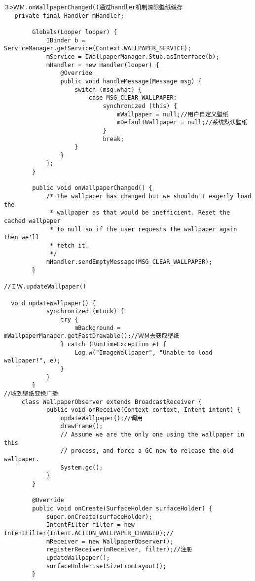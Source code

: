 \documentclass[a4paper,11pt,twoside,openany]{article}%
\begin{document}
\begin{CJK}{UTF8}{song}
\begin{verbatim}
３>ＷＭ.onWallpaperChanged()通过handler机制清除壁纸缓存 
   private final Handler mHandler; 
        
        Globals(Looper looper) { 
            IBinder b = ServiceManager.getService(Context.WALLPAPER_SERVICE); 
            mService = IWallpaperManager.Stub.asInterface(b); 
            mHandler = new Handler(looper) { 
                @Override 
                public void handleMessage(Message msg) { 
                    switch (msg.what) { 
                        case MSG_CLEAR_WALLPAPER: 
                            synchronized (this) { 
                                mWallpaper = null;//用户自定义壁纸 
                                mDefaultWallpaper = null;//系统默认壁纸 
                            } 
                            break; 
                    } 
                } 
            }; 
        } 
        
        public void onWallpaperChanged() { 
            /* The wallpaper has changed but we shouldn't eagerly load the 
             * wallpaper as that would be inefficient. Reset the cached wallpaper 
             * to null so if the user requests the wallpaper again then we'll 
             * fetch it. 
             */ 
            mHandler.sendEmptyMessage(MSG_CLEAR_WALLPAPER); 
        } 

//ＩＷ.updateWallpaper() 

  void updateWallpaper() { 
            synchronized (mLock) { 
                try { 
                    mBackground = mWallpaperManager.getFastDrawable();//ＷＭ去获取壁纸 
                } catch (RuntimeException e) { 
                    Log.w("ImageWallpaper", "Unable to load wallpaper!", e); 
                } 
            } 
        } 
//收到壁纸变换广播 
     class WallpaperObserver extends BroadcastReceiver { 
            public void onReceive(Context context, Intent intent) { 
                updateWallpaper();//调用 
                drawFrame(); 
                // Assume we are the only one using the wallpaper in this 
                // process, and force a GC now to release the old wallpaper. 
                System.gc(); 
            } 
        } 

        @Override 
        public void onCreate(SurfaceHolder surfaceHolder) { 
            super.onCreate(surfaceHolder); 
            IntentFilter filter = new IntentFilter(Intent.ACTION_WALLPAPER_CHANGED);// 
            mReceiver = new WallpaperObserver(); 
            registerReceiver(mReceiver, filter);//注册 
            updateWallpaper(); 
            surfaceHolder.setSizeFromLayout(); 
        } 


\end{verbatim}
\end{CJK}
\end{document}
